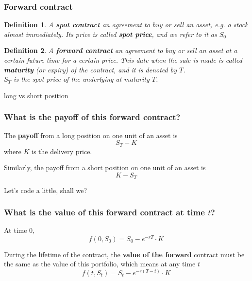 \documentclass[ignorenonframetext, 9pt]{beamer}
\newtheorem{de}{Definition}
\begin{document}
\begin{frame}
\frametitle{Forward contract}

\begin{de}
A \textbf{spot contract} an agreement to buy or sell an asset, e.g. a stock almost immediately. Its price is called \textbf{spot price}, and we refer to it as $S_0$
\end{de}

\pause

\begin{de}
A \textbf{forward contract} an agreement to buy or sell an asset at a certain future time for a certain price. This date when the sale is made is called \textbf{maturity} (or expiry) of the contract, and it is denoted by $T$. \\
$S_T$ is the spot price of the underlying at maturity $T$.
\end{de}

\vfill

\centering long vs short position
\end{frame}



\begin{frame}
\frametitle{What is the payoff of this forward contract?}

The \textbf{payoff} from a long position on one unit of an asset is
\begin{equation}
S_T - K
\end{equation}
where $K$ is the delivery price. \newline

\pause

Similarly, the payoff from a short position on one unit of an asset is
\begin{equation}
K - S_T
\end{equation}

\pause

\vfill
\begin{tcolorbox}[text width=\textwidth/4, boxrule=3pt, colback=mygreen!5!white, colframe=mygreen!75!black]
\textcolor{mygreen!50!black}{Let's code a little, shall we?}
\end{tcolorbox}

\end{frame}

\begin{frame}
\frametitle{What is the value of this forward contract at time $t$?}


At time $0$,
\begin{equation}
f(0, S_0) = S_0 - e^{-rT} \cdot K
\end{equation} \newline

\pause

During the lifetime of the contract, the \textbf{value of the forward} contract must be the same as the value of this portfolio, which means at any time $t$
\begin{equation}
f(t, S_t) = S_t - e^{-r(T-t)} \cdot K
\end{equation}


\end{frame}
\end{document}
